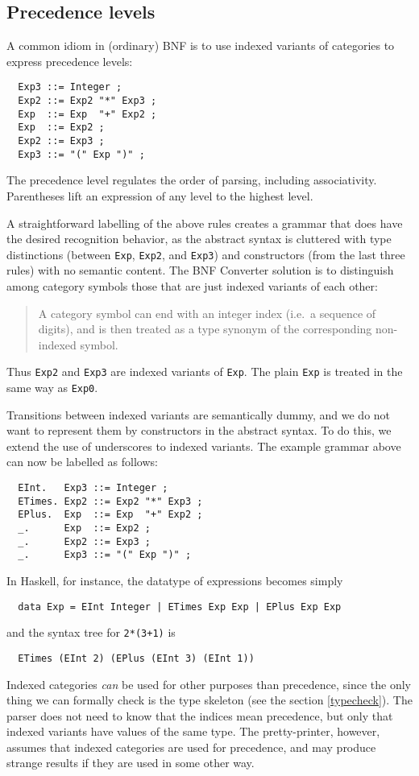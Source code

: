 \documentclass[10pt]{article}
\newcommand{\bequ}{\begin{quote}}
\newcommand{\enqu}{\end{quote}}
\begin{document}
\subsection{Precedence levels}

A common idiom in (ordinary) BNF is to use indexed variants of categories
to express precedence levels:
\begin{verbatim}
  Exp3 ::= Integer ;
  Exp2 ::= Exp2 "*" Exp3 ;
  Exp  ::= Exp  "+" Exp2 ;
  Exp  ::= Exp2 ;
  Exp2 ::= Exp3 ;
  Exp3 ::= "(" Exp ")" ;
\end{verbatim}
The precedence level regulates the order of parsing, including
associativity. Parentheses lift an expression of any level
to the highest level.

A straightforward labelling of the above rules creates a grammar that does
have the desired recognition behavior, as the abstract syntax is cluttered
with type distinctions (between {\tt Exp}, {\tt Exp2}, and {\tt Exp3})
and constructors (from the last three rules) with no semantic content.
The BNF Converter solution is to distinguish among
category symbols those that are just indexed variants of each other:
\bequ
A category symbol can end with an integer index
(i.e.\ a sequence of digits), and is then treated as a type
synonym of the corresponding non-indexed symbol.
\enqu
Thus {\tt Exp2} and {\tt Exp3} are indexed variants of {\tt Exp}.
The plain {\tt Exp} is treated in the same way as {\tt Exp0}.

Transitions between indexed variants are
semantically dummy, and we do not want to represent them by
constructors in the abstract syntax. To do this, we extend the use
of underscores to indexed variants.
The example grammar above can now be labelled as follows:
\begin{verbatim}
  EInt.   Exp3 ::= Integer ;
  ETimes. Exp2 ::= Exp2 "*" Exp3 ;
  EPlus.  Exp  ::= Exp  "+" Exp2 ;
  _.      Exp  ::= Exp2 ;
  _.      Exp2 ::= Exp3 ;
  _.      Exp3 ::= "(" Exp ")" ;
\end{verbatim}
In Haskell, for instance, the datatype of expressions becomes simply
\begin{verbatim}
  data Exp = EInt Integer | ETimes Exp Exp | EPlus Exp Exp
\end{verbatim}
and the syntax tree for {\tt 2*(3+1)} is
\begin{verbatim}
  ETimes (EInt 2) (EPlus (EInt 3) (EInt 1))
\end{verbatim}

Indexed categories {\em can} be used for other purposes than
precedence, since the only thing we can formally check is the
type skeleton (see the section \ref{typecheck}).
The parser does not need to know
that the indices mean precedence, but only that indexed
variants have values of the same type.
The pretty-printer, however, assumes that
indexed categories are used for precedence, and may produce
strange results if they are used in some other way.
\end{document}
